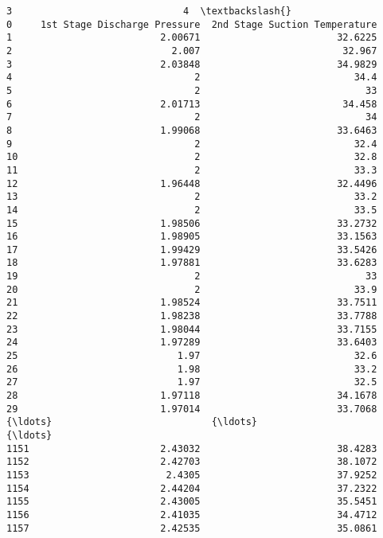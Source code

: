 \documentclass[11pt]{article}
\begin{document}
\begin{tcolorbox}[breakable, size=fbox, boxrule=.5pt, pad at break*=1mm, opacityfill=0]
\begin{Verbatim}[commandchars=\\\{\}]
                                 3                              4  \textbackslash{}
0     1st Stage Discharge Pressure  2nd Stage Suction Temperature
1                          2.00671                        32.6225
2                            2.007                         32.967
3                          2.03848                        34.9829
4                                2                           34.4
5                                2                             33
6                          2.01713                         34.458
7                                2                             34
8                          1.99068                        33.6463
9                                2                           32.4
10                               2                           32.8
11                               2                           33.3
12                         1.96448                        32.4496
13                               2                           33.2
14                               2                           33.5
15                         1.98506                        33.2732
16                         1.98905                        33.1563
17                         1.99429                        33.5426
18                         1.97881                        33.6283
19                               2                             33
20                               2                           33.9
21                         1.98524                        33.7511
22                         1.98238                        33.7788
23                         1.98044                        33.7155
24                         1.97289                        33.6403
25                            1.97                           32.6
26                            1.98                           33.2
27                            1.97                           32.5
28                         1.97118                        34.1678
29                         1.97014                        33.7068
{\ldots}                            {\ldots}                            {\ldots}
1151                       2.43032                        38.4283
1152                       2.42703                        38.1072
1153                        2.4305                        37.9252
1154                       2.44204                        37.2322
1155                       2.43005                        35.5451
1156                       2.41035                        34.4712
1157                       2.42535                        35.0861

\end{Verbatim}
\end{tcolorbox}
\end{document}
